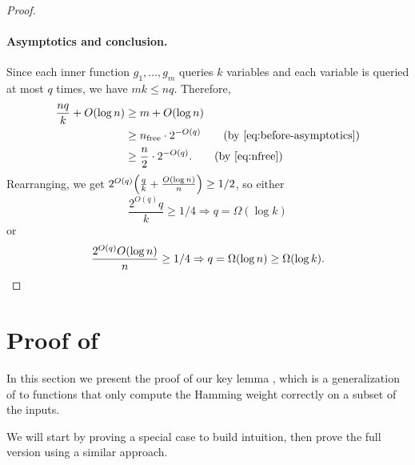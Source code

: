 \documentclass[10pt,a4paper]{article}
\theoremstyle{definition}
\theoremstyle{remark}
\DeclarePairedDelimiter{\p}{(}{)}
\newcommand{\nfree}{n_{\mathrm{free}}}
\begin{document}
\begin{proof}
\paragraph*{Asymptotics and conclusion.}
Since each inner function $g_1, \ldots, g_m$ queries $k$ variables and each variable is queried at most $q$ times, we have
$mk \leq nq$. %
Therefore,
\begin{align*}
    \frac{nq}{k} + O(\log n)
    &\geq m + O(\log n)\\%
    &\geq \nfree \cdot 2^{-O(q)}\tag{by \eqref{eq:before-asymptotics}}\\
    &\geq \frac{n}{2} \cdot 2^{-O(q)}.\tag{by \eqref{eq:nfree}}
\end{align*}
Rearranging, we get $2^{O(q)} \p*{\frac{q}{k} + \frac{O(\log n)}{n}} \geq 1/2$, so either
\[\frac{2^{O(q)}q}{k} \geq 1/4 \Rightarrow q = \Omega(\log k)\]
or
\[\frac{2^{O(q)}O(\log n)}{n} \geq 1/4 \Rightarrow q = \Omega(\log n) \geq \Omega(\log k).\qedhere\]
\end{proof}

\section{Proof of~}
\label{sec:proof-main}
In this section we present the proof of our key lemma , which is a generalization of  to functions that only compute the Hamming weight correctly on a subset of the inputs.

\keylemma*

We will start by proving a special case to build intuition, then prove the full version using a similar approach.
\end{document}
